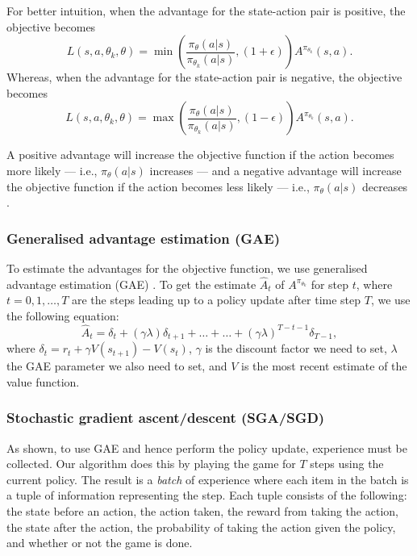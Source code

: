 \documentclass[12pt,a4paper]{article}
\begin{document}
For better intuition, when the advantage for the state-action pair is positive, the objective becomes \[L(s,a,\theta_k,\theta) = \min\left(\frac{\pi_{\theta}(a|s)}{\pi_{\theta_k}(a|s)}, (1 + \epsilon) \right)  A^{\pi_{\theta_k}}(s,a).\] Whereas, when the advantage for the state-action pair is negative, the objective becomes \[L(s,a,\theta_k,\theta) = \max\left(\frac{\pi_{\theta}(a|s)}{\pi_{\theta_k}(a|s)}, (1 - \epsilon) \right)  A^{\pi_{\theta_k}}(s,a).\]

A positive advantage will increase the objective function if the action becomes more likely --- i.e., \(\pi_{\theta}(a|s)\) increases --- and a negative advantage will increase the objective function if the action becomes less likely --- i.e., \(\pi_{\theta}(a|s)\) decreases \cite{SpinningUp2018}. 

\subsubsection{Generalised advantage estimation (GAE)}
To estimate the advantages for the objective function, we use generalised advantage estimation (GAE) \cite{schulman2018highdimensional}. To get the estimate $\hat{A}_t$ of $A^{\pi_{\theta_k}}$ for step $t$, where $t = 0, 1, \dots, T$ are the steps leading up to a policy update after time step $T$, we use the following equation: $$\hat{A}_t = \delta_t + (\gamma\lambda)\delta_{t+1} + \dots + \dots + (\gamma\lambda)^{T-t-1}\delta_{T-1},$$ where $\delta_t = r_t + \gamma V(s_{t+1}) - V(s_t)$, $\gamma$ is the discount factor we need to set, $\lambda$ the GAE parameter we also need to set, and $V$ is the most recent estimate of the value function. 

\subsubsection{Stochastic gradient ascent/descent (SGA/SGD)}
As shown, to use GAE and hence perform the policy update, experience must be collected. Our algorithm does this by playing the game for $T$ steps using the current policy. The result is a \emph{batch} of experience where each item in the batch is a tuple of information representing the step. Each tuple consists of the following: the state before an action, the action taken, the reward from taking the action, the state after the action, the probability of taking the action given the policy, and whether or not the game is done.
\end{document}
